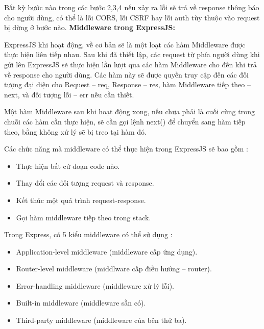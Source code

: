 Bất kỳ bước nào trong các bước 2,3,4 nếu xảy ra lỗi sẽ trả về response thông báo cho người dùng, có thể là lỗi CORS, lỗi CSRF hay lỗi auth tùy thuộc vào request bị dừng ở bước nào.
\textbf{Middleware trong ExpressJS:} 

ExpressJS khi hoạt động, về cơ bản sẽ là một loạt các hàm Middleware được thực hiện liên tiếp nhau. Sau khi đã thiết lập, các request từ phía người dùng khi gửi lên ExpressJS sẽ thực hiện lần lượt qua các hàm Middleware cho đến khi trả về response cho người dùng. Các hàm này sẽ được quyền truy cập đến các đối tượng đại diện cho Request – req, Response – res, hàm Middleware tiếp theo – next, và đối tượng lỗi – err nếu cần thiết.

Một hàm Middleware sau khi hoạt động xong, nếu chưa phải là cuối cùng trong chuỗi các hàm cần thực hiện, sẽ cần gọi lệnh next() để chuyển sang hàm tiếp theo, bằng không xử lý sẽ bị treo tại hàm đó.

Các chức năng mà middleware có thể thực hiện trong ExpressJS sẽ bao gồm :
\begin{itemize}
  \item Thực hiện bất cứ đoạn code nào.
  \item Thay đổi các đối tượng request và response.
  \item Kết thúc một quá trình request-response.
  \item Gọi hàm middleware tiếp theo trong stack.
\end{itemize}

Trong Express, có 5 kiểu middleware có thể sử dụng :
\begin{itemize}
  \item Application-level middleware (middleware cấp ứng dụng).
  \item Router-level middleware (middlware cấp điều hướng – router).
  \item Error-handling middleware (middleware xử lý lỗi).
  \item Built-in middleware (middleware sẵn có).
  \item Third-party middleware (middleware của bên thứ ba).
\end{itemize}